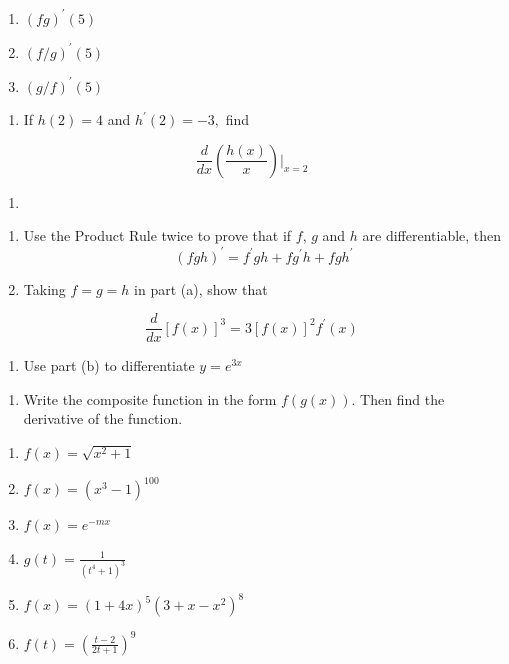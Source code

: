 \documentclass[]{book}
\providecommand{\tightlist}{%
  \setlength{\itemsep}{0pt}\setlength{\parskip}{0pt}}
\begin{document}
\begin{enumerate}
\def\labelenumi{(\alph{enumi})}
\tightlist
\item
  \((fg)^\prime(5)\)
\item
  \((f/g)^\prime(5)\)
\item
  \((g/f)^\prime(5)\)
\end{enumerate}

\begin{enumerate}
\def\labelenumi{\arabic{enumi}.}
\setcounter{enumi}{10}
\tightlist
\item
  If \(h(2) = 4\) and \(h^\prime(2) = -3,\) find
\end{enumerate}

\[\frac{d}{dx} \left( \frac{h(x)}{x} \right) \Bigr|_{x=2} \]

\begin{enumerate}
\def\labelenumi{\arabic{enumi}.}
\setcounter{enumi}{11}
\item
\end{enumerate}

\begin{enumerate}
\def\labelenumi{(\alph{enumi})}
\item
  Use the Product Rule twice to prove that if \(f\), \(g\) and \(h\) are differentiable, then
  \[(fgh)^\prime = f^\prime gh+ fg^\prime h + fgh^\prime\]
\item
  Taking \(f=g=h\) in part (a), show that
\end{enumerate}

\[\frac{d}{dx} [f(x)]^3= 3[f(x)]^2f^\prime(x)\]

\begin{enumerate}
\def\labelenumi{(\alph{enumi})}
\setcounter{enumi}{2}
\tightlist
\item
  Use part (b) to differentiate \(y= e^{3x}\)
\end{enumerate}

\newpage

\begin{enumerate}
\def\labelenumi{\arabic{enumi}.}
\setcounter{enumi}{12}
\tightlist
\item
  Write the composite function in the form \(f(g(x)).\) Then find the derivative of the function.
\end{enumerate}

\begin{enumerate}
\def\labelenumi{(\alph{enumi})}
\tightlist
\item
  \(f(x) = \sqrt{x^2+1}\)\\
\item
  \(f(x) = (x^3-1)^{100}\)\\
\item
  \(f(x) = e^{-mx}\)
\item
  \(g(t) =\frac{1}{(t^4+1)^3}\)
\item
  \(f(x) = (1+4x)^5(3+x-x^2)^8\)
\item
  \(f(t) = \left( \frac{t-2}{2t+1} \right)^9\)
\end{enumerate}
\end{document}
